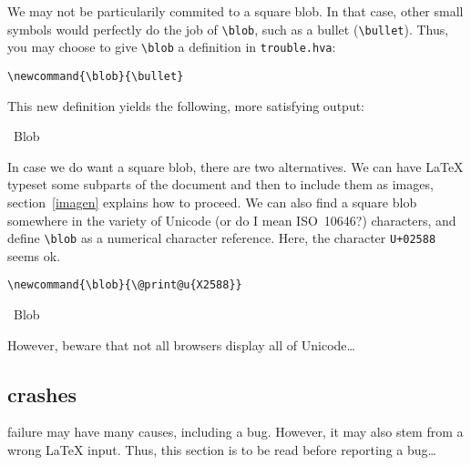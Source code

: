 We may not be particularily commited to a square blob.
In that case, other small symbols would perfectly do the job
of \verb+\blob+, such as a bullet (\verb+\bullet+).
Thus, you may choose to give \verb+\blob+ a definition in
\verb+trouble.hva+:
\begin{verbatim}
\newcommand{\blob}{\bullet}
\end{verbatim}
This new definition yields the following, more satisfying output:
\begin{htmlout}\newcommand{\blob}{\bullet}%
\begin{htmlonly}%
\blob\ Blob \blob
\end{htmlonly}
\begin{latexonly}\vspace*{.5ex}
%
\end{latexonly}%
\end{htmlout}

\label{square:blob}
%
In case we do want a square blob, there are two alternatives.
We can have \LaTeX{} typeset some subparts of
the document and then to include them as images, section~\ref{imagen}
explains how to proceed.
We can also find a square blob somewhere in the variety of Unicode
(or do I mean ISO~10646?) characters,
and define \verb+\blob+ as a numerical
character reference. Here, the character \texttt{U+02588}
seems ok.
\begin{verbatim}
\newcommand{\blob}{\@print@u{X2588}}
\end{verbatim}
\begin{htmlout}%
\begin{htmlonly}\newcommand{\blob}{}%
\blob\ Blob \blob
\end{htmlonly}
\begin{latexonly}\vspace*{.5ex}
%
\end{latexonly}%
\end{htmlout}
However, beware that not all browsers display all of Unicode\ldots


\subsection{\hevea{} crashes}

\hevea{} failure may have many causes, including a bug.
However, it may also stem from a wrong \LaTeX{} input.
Thus, this section is to be read before reporting a bug\ldots

